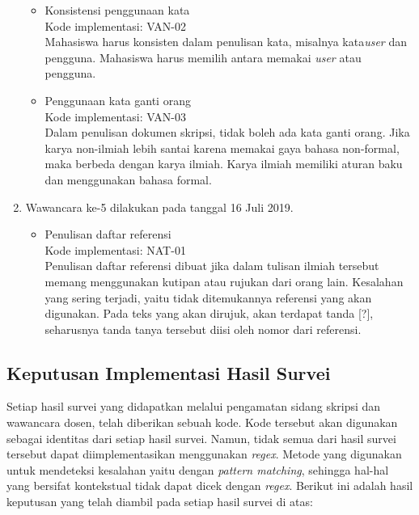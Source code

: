 \begin{enumerate}
\begin{itemize}
			\item Konsistensi penggunaan kata \\
			Kode implementasi: VAN-02 \\
			Mahasiswa harus konsisten dalam penulisan kata, misalnya kata\textit{user} dan pengguna.  Mahasiswa harus memilih antara memakai \textit{user} atau pengguna.
			
			\item Penggunaan kata ganti orang \\
			Kode implementasi: VAN-03 \\
			Dalam penulisan dokumen skripsi, tidak boleh ada kata ganti orang. Jika karya non-ilmiah lebih santai karena memakai gaya bahasa non-formal, maka berbeda dengan karya ilmiah. Karya ilmiah memiliki aturan baku dan menggunakan bahasa formal. 
			
		\end{itemize}
		
	\item Wawancara ke-5 dilakukan pada tanggal 16 Juli 2019.
	
		\begin{itemize}
			\item Penulisan daftar referensi \\
			Kode implementasi: NAT-01 \\ 
			Penulisan daftar referensi dibuat jika dalam tulisan ilmiah tersebut memang menggunakan kutipan atau rujukan dari orang lain. Kesalahan yang sering terjadi, yaitu tidak ditemukannya referensi yang akan digunakan. Pada teks yang akan dirujuk, akan terdapat tanda [?], seharusnya tanda tanya tersebut diisi oleh nomor dari referensi.
			
		\end{itemize}
		
\end{enumerate}

\subsection{Keputusan Implementasi Hasil Survei}

Setiap hasil survei yang didapatkan melalui pengamatan sidang skripsi dan wawancara dosen, telah diberikan sebuah kode. Kode tersebut akan digunakan sebagai identitas dari setiap hasil survei. Namun, tidak semua dari hasil survei tersebut dapat diimplementasikan menggunakan \textit{regex}. Metode yang digunakan untuk mendeteksi kesalahan yaitu dengan \textit{pattern matching}, sehingga hal-hal yang bersifat kontekstual tidak dapat dicek dengan \textit{regex}. Berikut ini adalah hasil keputusan yang telah diambil pada setiap hasil survei di atas:

